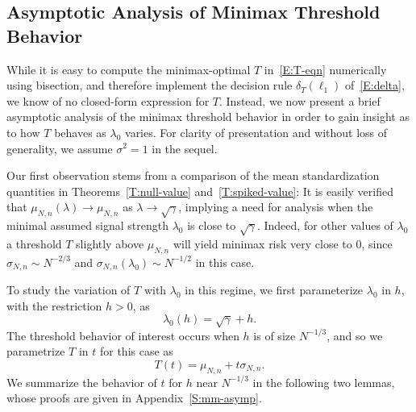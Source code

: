 \documentclass[final]{IEEEtran} %
\newcommand{\ulambda}{\lambda_0}
\begin{document}
\subsection{Asymptotic Analysis of Minimax Threshold Behavior}

While it is easy to compute the minimax-optimal $T$ in~\eqref{E:T-eqn} numerically using bisection, and therefore implement the decision rule $\delta_T( \ell_1 )$ of~\eqref{E:delta}, we know of no closed-form expression for $T$.  Instead, we now present a brief asymptotic analysis of the minimax threshold behavior in order to gain insight as to how $T$ behaves as $\ulambda$ varies.  For clarity of presentation and without loss of generality, we assume $\sigma^2 = 1$ in the sequel.

Our first observation stems from a comparison of the mean standardization quantities in Theorems~\ref{T:null-value} and~\ref{T:spiked-value}: It is easily verified that $\mu_{N,n}(\lambda) \to \mu_{N,n}$ as
$\lambda \to \sqrt{\gamma}$, implying a need for analysis when
the minimal assumed signal strength $\ulambda$ is close to $\sqrt{\gamma}$.
Indeed, for other values of $\ulambda$ a threshold $T$ slightly above $\mu_{N,n}$ will yield minimax risk very close to $0$, since $\sigma_{N,n} \sim N^{-2/3}$ and $\sigma_{N,n}(\ulambda) \sim N^{-1/2}$ in this case.

To study the variation of $T$ with $\ulambda$ in this regime, we first parameterize $\ulambda$ in $h$, with the restriction $h > 0$, as
\begin{equation}\label{E:Lh}
    \ulambda(h) = \sqrt{ \gamma } + h.
\end{equation}
The threshold behavior of interest occurs when $h$ is of size $N^{-1/3}$, and so we parametrize $T$ in $t$ for this case as
\begin{equation}\label{E:Tt}
    T(t) = \mu_{N,n} + t \sigma_{N,n}.
\end{equation}
We summarize the behavior of $t$ for $h$ near $N^{-1/3}$ in the following two lemmas, whose proofs are given in Appendix~\ref{S:mm-asymp}.
\end{document}
